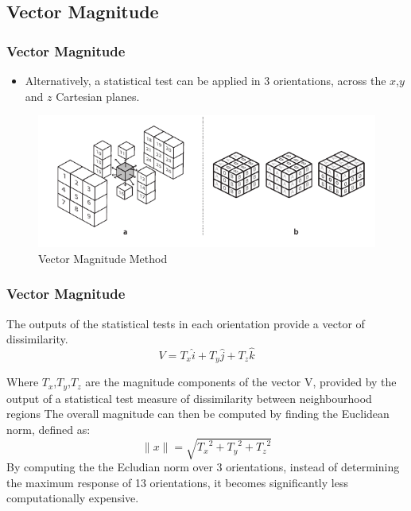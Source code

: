 \documentclass[9pt]{beamer}
\begin{document}
 \subsection{Vector Magnitude}
\begin{frame}
\frametitle{Vector Magnitude}
\begin{itemize}
\item Alternatively, a statistical test can be applied in 3 orientations, across the $x$,$y$ and $z$ Cartesian planes.
\end{itemize}
\begin{figure}
\includegraphics[scale=0.8]{cubeAngles3}
\caption{Vector Magnitude Method}
\end{figure}
\end{frame}
\begin{frame}
\frametitle{ Vector Magnitude}

The outputs of the statistical tests in each orientation provide a vector of dissimilarity.\\

		\begin{equation}
				V= T_{x}\hat{i}+T_{y}\hat{j}+T_{z}\hat{k}
		\end{equation}
		
		Where $T_{x}$,$T_{y}$,$T_{z}$ are the magnitude components of the vector V, provided by the output of a statistical test measure of dissimilarity between neighbourhood regions  The overall magnitude can then be computed by finding the Euclidean norm, defined as:\\
			\begin{equation}
				\|x\| = \sqrt{{T_{x}}^{2}+{T_{y}}^{2}+{T_{z}}^{2}}	
			\end{equation}	
	 By computing the the Ecludian norm over 3 orientations, instead of determining the maximum response of 13 orientations, it becomes significantly less computationally expensive.

\end{frame}
\end{document}
